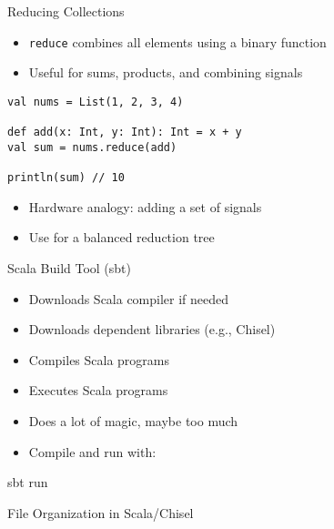 \begin{frame}[fragile]{Reducing Collections}
\begin{itemize}
    \item \texttt{reduce} combines all elements using a binary function
    \item Useful for sums, products, and combining signals
\end{itemize}

\begin{verbatim}
val nums = List(1, 2, 3, 4)

def add(x: Int, y: Int): Int = x + y
val sum = nums.reduce(add)

println(sum) // 10
\end{verbatim}

\begin{itemize}
    \item Hardware analogy: adding a set of signals
    \item Use  for a balanced reduction tree
\end{itemize}
\end{frame}



\begin{frame}[fragile]{Scala Build Tool (sbt)}
\begin{itemize}
\item Downloads Scala compiler if needed
\item Downloads dependent libraries (e.g., Chisel)
\item Compiles Scala programs
\item Executes Scala programs
\item Does a lot of magic, maybe too much
\item Compile and run with:
\end{itemize}
\begin{chisel}
sbt run
\end{chisel}
\end{frame}

\begin{frame}[fragile]{File Organization in Scala/Chisel}
\end{frame}



